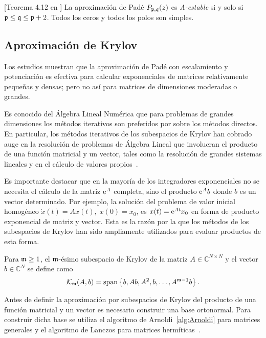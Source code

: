 \begin{theorem}\label{Stab. Pade}[Teorema 4.12 en \cite{wanner1996solving}] 
    La aproximación de Padé $P_{\mathfrak{p},\mathfrak{q}}(z)$  es \emph{A-estable} si y solo si $\mathfrak{p}\leq \mathfrak{q}\leq \mathfrak{p}+2$. 
    Todos los ceros y todos los polos son simples.
\end{theorem}

\subsection{Aproximación de Krylov}

Los estudios muestran que la aproximación de Padé con escalamiento y potenciación
es efectiva para calcular exponenciales de matrices relativamente peque\~nas y densas; pero no as\'i para matrices de dimensiones moderadas o grandes.

Es conocido del \'Algebra Lineal Numérica que para problemas de
grandes dimensiones los métodos iterativos son preferidos por sobre los métodos directos.
En particular,
los métodos iterativos de los subespacios de Krylov han cobrado auge en la resolución de
problemas de \'Algebra Lineal que involucran el producto de una función matricial y un vector,
tales como la resolución de grandes sistemas lineales y en el c\'alculo de valores
propios~\cite{golub2013matrix}.

Es importante destacar que en la mayor\'ia de los integradores exponenciales
 no se necesita el c\'alculo de la matriz $\mathrm{e}^{A}$ completa, sino
el producto $\mathrm{e}^{A}b$ donde $b$ es un vector determinado. Por ejemplo, la solución del problema de valor inicial homogéneo $\dot{x}(t)=Ax(t),\;x(0)=x_0$, es $x(t)=\mathrm{e}^{At}x_0$ en forma de producto exponencial de matriz y vector. Esta es la razón por la que
los métodos de los subespacios de Krylov han sido ampliamente utilizados para evaluar productos de esta forma.

\begin{definition}
        \cite{Saad92} Para $\mathfrak{m}\geq 1$, el $\mathfrak{m}$-ésimo subespacio de Krylov de la matriz $A\in\mathbb{C}^{N\times N}$
    y el vector $b\in\mathbb{C}^{N}$ se define como
    \[ \mathcal{K}_{\mathfrak{m}}(A,b)=\mathrm{span}\left\{ b,Ab,A^{2},b,\ldots,A^{\mathfrak{m}-1}b \right\}. \]
\end{definition}

Antes de definir la aproximación por subespacios de Krylov del producto de una función matricial y un vector es
necesario construir una base ortonormal. Para construir dicha base se utiliza el algoritmo de
Arnoldi~\ref{alg:Arnoldi} para matrices generales y el algoritmo de 
Lanczos para matrices hermíticas~\cite{arnoldi,saad2003iterative}.

